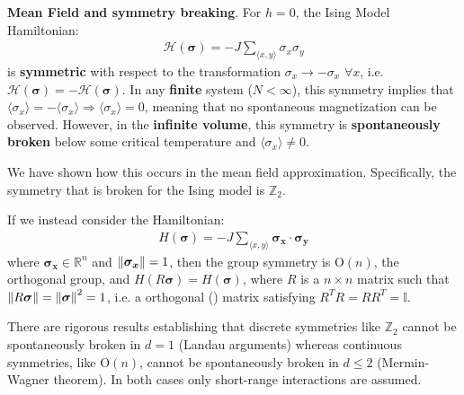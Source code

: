 \documentclass[../../main.tex]{subfiles}
\begin{document}
\begin{appr}\textbf{Mean Field and symmetry breaking}. For $h=0$, the Ising Model Hamiltonian:
    \begin{align*}
        \mathcal{H}(\bm{\sigma}) = -J \sum_{\langle x,y \rangle} \sigma_x \sigma_y
    \end{align*} 
    is \textbf{symmetric} with respect to the transformation $\sigma_x \to -\sigma_x$ $\forall x$, i.e. $\mathcal{H}(\bm{\sigma}) = -\mathcal{H}(\bm{\sigma})$. In any \textbf{finite} system ($N < \infty$), this symmetry implies that $\langle \sigma_x \rangle = - \langle \sigma_x \rangle \Rightarrow \langle \sigma_x \rangle = 0$, meaning that no spontaneous magnetization can be observed. However, in the \textbf{infinite volume}, this symmetry is \textbf{spontaneously broken} below some critical temperature and $\langle \sigma_x \rangle \neq 0$. %
    
    We have shown how this occurs in the mean field approximation. Specifically, the symmetry that is broken for the Ising model is $\mathbb{Z}_2$.
    
    \medskip

    If we instead consider the Hamiltonian:
    \begin{align*}
        H(\bm{\sigma}) = -J \sum_{\langle x,y \rangle} \bm{\sigma_x} \cdot \bm{\sigma_y}
    \end{align*}
    where $\bm{\sigma_x} \in \mathbb{R}^n$ and $\norm{\bm{\sigma_x}} = 1$, then the group symmetry is $\mathrm{O}(n)$, the orthogonal group, and $H(R \bm{\sigma}) = H(\bm{\sigma})$, where $R$ is a $n\times n$ matrix such that $\norm{R \bm{\sigma}} = \norm{\bm{\sigma}}^2 = 1$, i.e. a orthogonal () matrix satisfying $R^TR = RR^T = \mathbb{I}$. 

    There are rigorous results establishing that discrete symmetries like $\mathbb{Z}_2$ cannot be spontaneously broken in $d=1$ (Landau arguments) whereas continuous symmetries, like $\mathrm{O}(n)$, cannot be spontaneously broken in $d \leq 2$ (Mermin-Wagner theorem). In both cases only short-range interactions are assumed.
\end{appr}
\end{document}
